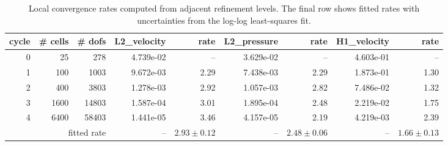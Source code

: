 \begin{table}[htbp]
\centering
\begin{tabular}{|r|r|r|r|r|r|r|r|r|}
\hline
cycle & \# cells & \# dofs & L2\_velocity & rate & L2\_pressure & rate & H1\_velocity & rate \\ \hline
0 & 25 & 278 & 4.739e-02 & -- & 3.629e-02 & -- & 4.603e-01 & -- \\ \hline
1 & 100 & 1003 & 9.672e-03 & 2.29 & 7.438e-03 & 2.29 & 1.873e-01 & 1.30 \\ \hline
2 & 400 & 3803 & 1.278e-03 & 2.92 & 1.057e-03 & 2.82 & 7.486e-02 & 1.32 \\ \hline
3 & 1600 & 14803 & 1.587e-04 & 3.01 & 1.895e-04 & 2.48 & 2.219e-02 & 1.75 \\ \hline
4 & 6400 & 58403 & 1.441e-05 & 3.46 & 4.157e-05 & 2.19 & 4.219e-03 & 2.39 \\ \hline
\multicolumn{3}{|r|}{fitted rate} & -- & $2.93 \pm 0.12$ & -- & $2.48 \pm 0.06$ & -- & $1.66 \pm 0.13$ \\ \hline
\end{tabular}
\caption{Local convergence rates computed from adjacent refinement levels. The final row shows fitted rates with uncertainties from the log-log least-squares fit.}
\end{table}

